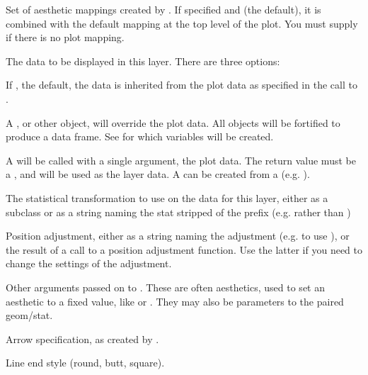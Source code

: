 \documentclass[a4paper]{book}
\begin{document}
\begin{Arguments}
\begin{ldescription}
\item[\code{mapping}] Set of aesthetic mappings created by . If specified and
 (the default), it is combined with the default mapping
at the top level of the plot. You must supply  if there is no plot
mapping.

\item[\code{data}] The data to be displayed in this layer. There are three
options:

If , the default, the data is inherited from the plot
data as specified in the call to .

A , or other object, will override the plot
data. All objects will be fortified to produce a data frame. See
 for which variables will be created.

A  will be called with a single argument,
the plot data. The return value must be a , and
will be used as the layer data. A  can be created
from a  (e.g. ).

\item[\code{stat}] The statistical transformation to use on the data for this
layer, either as a   subclass or as a string naming the
stat stripped of the  prefix (e.g.  rather than
)

\item[\code{position}] Position adjustment, either as a string naming the adjustment
(e.g.  to use ), or the result of a call to a
position adjustment function. Use the latter if you need to change the
settings of the adjustment.

\item[\code{...}] Other arguments passed on to . These are
often aesthetics, used to set an aesthetic to a fixed value, like
 or . They may also be parameters
to the paired geom/stat.

\item[\code{arrow}] Arrow specification, as created by .

\item[\code{lineend}] Line end style (round, butt, square).


\end{ldescription}
\end{Arguments}
\end{document}
